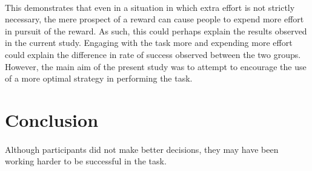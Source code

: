 \documentclass[12pt]{article}
\begin{document}
\paragraph{} This demonstrates that even in a situation in which extra effort is not strictly necessary, the mere prospect of a reward can cause people to expend more effort in pursuit of the reward. As such, this could perhaps explain the results observed in the current study. Engaging with the task more and expending more effort could explain the difference in rate of success observed between the two groups. However, the main aim of the present study was to attempt to encourage the use of a more optimal strategy in performing the task. 

\section*{Conclusion}
\paragraph{} Although participants did not make better decisions, they may have been working harder to be successful in the task. 
\clearpage
\begingroup\onehalfspacing
\newpage
{}


\endgroup
\end{document}
